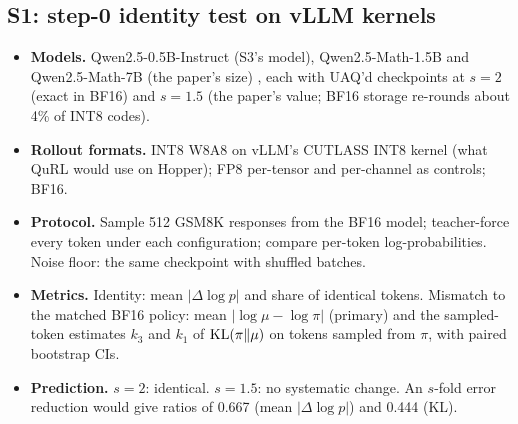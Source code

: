 \documentclass[11pt]{article}
\begin{document}
\subsection{S1: step-0 identity test on vLLM kernels}\label{sec:s1}
\begin{itemize}
\item \textbf{Models.} Qwen2.5-0.5B-Instruct \citep{qwen2024qwen25} (S3's model), Qwen2.5-Math-1.5B and Qwen2.5-Math-7B (the paper's size) \citep{yang2024qwen25math}, each with UAQ'd checkpoints at $s=2$ (exact in BF16) and $s=1.5$ (the paper's value; BF16 storage re-rounds about 4\% of INT8 codes).
\item \textbf{Rollout formats.} INT8 W8A8 on vLLM's \citep{kwon2023vllm} CUTLASS INT8 kernel (what QuRL would use on Hopper); FP8 per-tensor and per-channel as controls; BF16.
\item \textbf{Protocol.} Sample 512 GSM8K responses from the BF16 model; teacher-force every token under each configuration; compare per-token log-probabilities. Noise floor: the same checkpoint with shuffled batches.
\item \textbf{Metrics.} Identity: mean $|\Delta\log p|$ and share of identical tokens. Mismatch to the matched BF16 policy: mean $|\log\mu-\log\pi|$ (primary) and the sampled-token estimates $k_3$ and $k_1$ of $\mathrm{KL}(\pi\|\mu)$ on tokens sampled from $\pi$, with paired bootstrap CIs.
\item \textbf{Prediction.} $s=2$: identical. $s=1.5$: no systematic change. An $s$-fold error reduction would give ratios of 0.667 (mean $|\Delta\log p|$) and 0.444 (KL).
\end{itemize}
\end{document}
